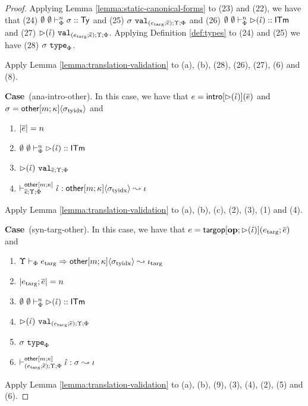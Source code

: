 \documentclass[12pt]{article}
\newcommand{\pfcase}[1]{\textbf{Case}~#1. }
\begin{document}
\begin{proof}
Applying Lemma \ref{lemma:static-canonical-forms} to (23) and (22), we have that (24) $\emptyset~\emptyset \vdash_{\Phi}^{n} \sigma :: {\sf Ty}$ and (25) $\sigma~\mathtt{val}_{(e_\text{targ}; \overline{e}); \Upsilon; \Phi}$ and (26) $\emptyset~\emptyset \vdash_{\Phi}^{n} {\rhd}(\hat{\iota}) :: {\sf ITm}$ and (27) ${\rhd}(\hat{\iota})~\mathtt{val}_{(e_\text{targ}; \overline{e});\Upsilon;\Phi}$.  Applying Definition \ref{def:types} to (24) and (25) we have (28) $\sigma~\mathtt{type}_{\Phi}$.

Apply Lemma \ref{lemma:translation-validation} to (a), (b), (28), (26), (27), (6) and (8).

\pfcase{(ana-intro-other)} In this case, we have that $e={\sf intro}[{\rhd}(\hat{\iota})](\overline{e})$ and $\sigma={{\sf other}[m; \kappa]}\langle\sigma_\text{tyidx}\rangle$ and \begin{enumerate}[(1)]
    \item $|\overline{e}|=n$
    \item $\emptyset~\emptyset \vdash_{\Phi}^{n} {\rhd}(\hat{\iota}) :: {\sf ITm}$
    \item ${\rhd}(\hat{\iota})~\mathtt{val}_{\overline{e}; \Upsilon; \Phi}$
    \item $\vdash_{\overline{e};\Upsilon;\Phi}^{{\sf other}[m;\kappa]} \hat{\iota} : {{{\sf other}[m;\kappa]}\langle\sigma_\text{tyidx}\rangle} \leadsto \iota$
\end{enumerate}

Apply Lemma \ref{lemma:translation-validation} to (a), (b), (c), (2), (3), (1) and (4).

\pfcase{(syn-targ-other)} In this case, we have that $e={\sf targop}[\textbf{op}; {\rhd}(\hat{\iota})](e_\text{targ}; \overline{e})$ and \begin{enumerate}[(1)]
    \item $\Upsilon \vdash_{\Phi} e_\text{targ} \Rightarrow {{\sf other}[m;\kappa]}\langle\sigma_\text{tyidx}\rangle \leadsto \iota_\text{targ}$
    \item $|e_\text{targ}; \overline{e}| = n$
    \item $\emptyset~\emptyset \vdash_{\Phi}^{n} {\rhd}(\hat{\iota}) :: {\sf ITm}$
    \item ${\rhd}(\hat{\iota})~\mathtt{val}_{(e_\text{targ}; \overline{e}); \Upsilon; \Phi}$
    \item $\sigma~\mathtt{type}_{\Phi}$
    \item $\vdash_{(e_\text{targ}; \overline{e});\Upsilon;\Phi}^{{\sf other}[m;\kappa]} \hat{\iota} : {\sigma} \leadsto \iota$
\end{enumerate}

Apply Lemma \ref{lemma:translation-validation} to (a), (b), (9), (3), (4), (2), (5) and (6).
\end{proof}
\end{document}
